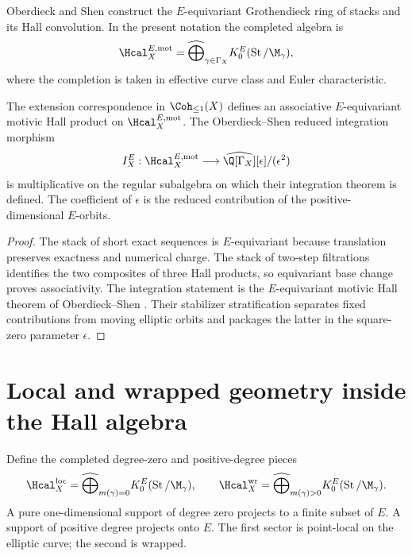 Oberdieck and Shen construct the $E$-equivariant Grothendieck ring of stacks and its Hall convolution.  In the present notation the completed algebra is
\[
 \Hcal_X^{E,\mathrm{mot}}
 =\widehat\bigoplus_{\gamma\in\Gamma_X}
 K_0^E(\operatorname{St}/\M_\gamma),
\]
where the completion is taken in effective curve class and Euler characteristic.

\begin{theorem}
The extension correspondence in $\Coh_{\leq1}(X)$ defines an associative $E$-equivariant motivic Hall product on $\Hcal_X^{E,\mathrm{mot}}$.  The Oberdieck--Shen reduced integration morphism
\[
 I_X^E:\Hcal_X^{E,\mathrm{mot}}
 \longrightarrow
 \widehat{\Q[\Gamma_X]}[\epsilon]/(\epsilon^2)
\]
is multiplicative on the regular subalgebra on which their integration theorem is defined.  The coefficient of $\epsilon$ is the reduced contribution of the positive-dimensional $E$-orbits.
\end{theorem}
\begin{proof}
The stack of short exact sequences is $E$-equivariant because translation preserves exactness and numerical charge.  The stack of two-step filtrations identifies the two composites of three Hall products, so equivariant base change proves associativity.  The integration statement is the $E$-equivariant motivic Hall theorem of Oberdieck--Shen \cite{OberdieckShen}.  Their stabilizer stratification separates fixed contributions from moving elliptic orbits and packages the latter in the square-zero parameter $\epsilon$.
\end{proof}

\chapter{Local and wrapped geometry inside the Hall algebra}
Define the completed degree-zero and positive-degree pieces
\[
 \Hcal_X^{\mathrm{loc}}
 =\widehat\bigoplus_{m(\gamma)=0}
 K_0^E(\operatorname{St}/\M_\gamma),
 \qquad
 \Hcal_X^{\mathrm{wr}}
 =\widehat\bigoplus_{m(\gamma)>0}
 K_0^E(\operatorname{St}/\M_\gamma).
\]
A pure one-dimensional support of degree zero projects to a finite subset of $E$.  A support of positive degree projects onto $E$.  The first sector is point-local on the elliptic curve; the second is wrapped.

